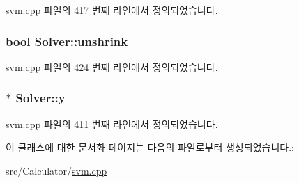 svm.\+cpp 파일의 417 번째 라인에서 정의되었습니다.

\hypertarget{class_solver_a62ded1c184aeb28f8dee04eb4a10530a}{
\subsubsection[{unshrink}]{\setlength{\rightskip}{0pt plus 5cm}bool Solver\+::unshrink\hspace{0.3cm}{\ttfamily [protected]}}}\label{class_solver_a62ded1c184aeb28f8dee04eb4a10530a}


svm.\+cpp 파일의 424 번째 라인에서 정의되었습니다.

\hypertarget{class_solver_a3acc1043d06dedf87f054ff3eea5c426}{
\subsubsection[{y}]{$\ast$ Solver\+::y\hspace{0.3cm}{\ttfamily [protected]}}}\label{class_solver_a3acc1043d06dedf87f054ff3eea5c426}


svm.\+cpp 파일의 411 번째 라인에서 정의되었습니다.



이 클래스에 대한 문서화 페이지는 다음의 파일로부터 생성되었습니다.\+:\begin{DoxyCompactItemize}
\item 
src/\+Calculator/\hyperlink{svm_8cpp}{svm.\+cpp}\end{DoxyCompactItemize}
